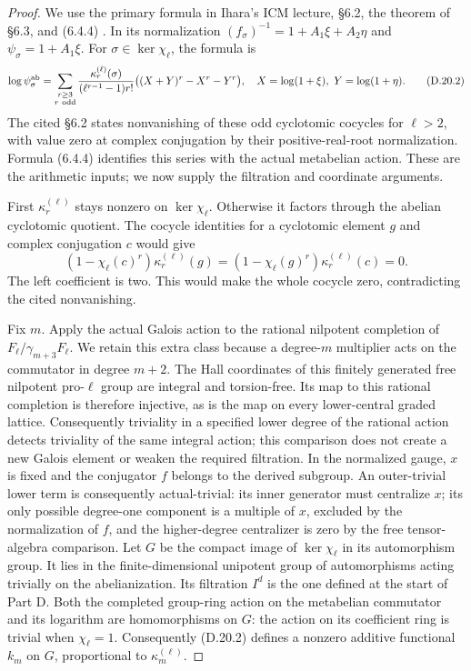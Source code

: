 \begin{proof}
We use the primary formula in Ihara's ICM lecture,
\S6.2, the theorem of \S6.3, and (6.4.4)
\cite{DIharaICM1991}. In its normalization
$(f_\sigma)^{-1}=1+A_1\xi+A_2\eta$ and
$\psi_\sigma=1+A_1\xi$. For $\sigma\in\ker\chi_\ell$,
the formula is
\[
 \log\psi_\sigma^{\rm ab}
   =\sum_{\substack{r\ge3\\r\ {\rm odd}}}
       \frac{\kappa_r^{(\ell)}(\sigma)}
            {(\ell^{r-1}-1)r!}
       \big((X+Y)^r-X^r-Y^r\big),
 \quad X=\log(1+\xi),\ Y=\log(1+\eta).
 \tag{D.20.2}
\]
The cited \S6.2 states nonvanishing of these odd cyclotomic
cocycles for $\ell>2$, with value zero at complex conjugation
by their positive-real-root normalization. Formula (6.4.4)
identifies this series with the actual metabelian action.
These are the arithmetic inputs; we now supply the filtration
and coordinate arguments.

First $\kappa_r^{(\ell)}$ stays nonzero on $\ker\chi_\ell$.
Otherwise it factors through the abelian cyclotomic quotient.
The cocycle identities for a cyclotomic element $g$ and complex
conjugation $c$ would give
\[
 (1-\chi_\ell(c)^r)\kappa_r^{(\ell)}(g)
       =(1-\chi_\ell(g)^r)\kappa_r^{(\ell)}(c)=0.
\]
The left coefficient is two. This would make the whole
cocycle zero, contradicting the cited nonvanishing.

Fix $m$. Apply the actual Galois action to the rational
nilpotent completion of $F_\ell/\gamma_{m+3}F_\ell$.
We retain this extra class because a degree-$m$ multiplier
acts on the commutator in degree $m+2$.
The Hall coordinates of this finitely generated free
nilpotent pro-$\ell$ group are integral and torsion-free.
Its map to this rational completion is therefore injective,
as is the map on every lower-central graded lattice.
Consequently triviality in a specified lower degree of
the rational action detects triviality of the same
integral action; this comparison does not create a
new Galois element or weaken the required filtration.
In the normalized gauge, $x$ is fixed and the conjugator
$f$ belongs to the derived subgroup. An outer-trivial
lower term is consequently actual-trivial: its inner
generator must centralize $x$; its only possible
degree-one component is a multiple of $x$, excluded
by the normalization of $f$, and the higher-degree
centralizer is zero by the free tensor-algebra comparison.
Let $G$ be the compact image of $\ker\chi_\ell$ in its
automorphism group. It lies in the finite-dimensional
unipotent group of automorphisms acting trivially on
the abelianization. Its filtration $I^d$ is the one
defined at the start of Part D. Both the completed
group-ring action on the metabelian commutator and its
logarithm are homomorphisms on $G$: the action on its
coefficient ring is trivial when $\chi_\ell=1$.
Consequently (D.20.2) defines a nonzero additive
functional $k_m$ on $G$, proportional to $\kappa_m^{(\ell)}$.


\end{proof}
